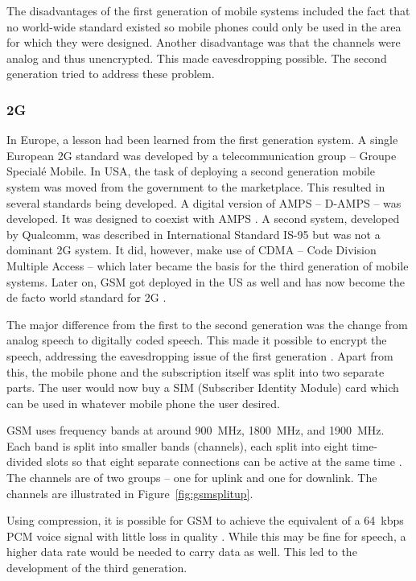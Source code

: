The disadvantages of the first generation of mobile systems included the fact that no world-wide standard existed so mobile phones could only be used in the area for which they were designed. Another disadvantage was that the channels were analog and thus unencrypted. This made eavesdropping possible. The second generation tried to address these problem.

\subsubsection{2G}
In Europe, a lesson had been learned from the first generation system. A single European 2G standard was developed by a telecommunication group -- Groupe Special\'{e} Mobile. In USA, the task of deploying a second generation mobile system was moved from the government to the marketplace. This resulted in several standards being developed. A digital version of AMPS -- D-AMPS -- was developed. It was designed to coexist with AMPS \cite{tanenbaum2012computer}. A second system, developed by Qualcomm, was described in International Standard IS-95 but was not a dominant 2G system. It did, however, make use of CDMA -- Code Division Multiple Access -- which later became the basis for the third generation of mobile systems. Later on, GSM got deployed in the US as well and has now become the de facto world standard for 2G \cite{ramjee1998universal}.

The major difference from the first to the second generation was the change from analog speech to digitally coded speech. This made it possible to encrypt the speech, addressing the eavesdropping issue of the first generation \cite{tanenbaum2012computer}. Apart from this, the mobile phone and the subscription itself was split into two separate parts. The user would now buy a SIM (Subscriber Identity Module) card which can be used in whatever mobile phone the user desired.

GSM uses frequency bands at around \SI{900}{MHz}, \SI{1800}{MHz}, and \SI{1900}{MHz}. Each band is split into smaller bands (channels), each split into eight time-divided slots so that eight separate connections can be active at the same time \cite{tanenbaum2012computer}. The channels are of two groups -- one for uplink and one for downlink. The channels are illustrated in Figure~\ref{fig:gsmsplitup}. 

Using compression, it is possible for GSM to achieve the equivalent of a \SI{64}{kbps} PCM voice signal with little loss in quality \cite{tanenbaum2012computer}. While this may be fine for speech, a higher data rate would be needed to carry data as well. This led to the development of the third generation.

